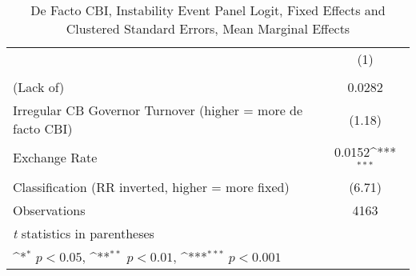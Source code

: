 \begin{table}[htbp]\centering
\def\sym#1{\ifmmode^{#1}\else\(^{#1}\)\fi}
\caption{De Facto CBI, Instability Event Panel Logit, Fixed Effects and Clustered Standard Errors, Mean Marginal Effects \label{margsJustBinInstabEventDJ}}
\begin{tabular}{l*{1}{c}}
\toprule
                &\multicolumn{1}{c}{(1)}\\
                &\multicolumn{1}{c}{}\\
\midrule
(Lack of)       &   0.0282         \\
Irregular CB Governor Turnover (higher = more de facto CBI)&   (1.18)         \\
\addlinespace
Exchange Rate   &   0.0152\sym{***}\\
Classification (RR inverted, higher = more fixed)&   (6.71)         \\
\midrule
Observations    &     4163         \\
\bottomrule
\multicolumn{2}{l}{\footnotesize \textit{t} statistics in parentheses}\\
\multicolumn{2}{l}{\footnotesize \sym{*} \(p<0.05\), \sym{**} \(p<0.01\), \sym{***} \(p<0.001\)}\\
\end{tabular}
\end{table}
